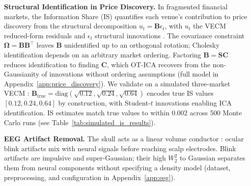 \documentclass[accepted]{tpm2026} %
\begin{document}
\textbf{Structural Identification in Price Discovery.}
In fragmented financial markets, the Information Share (IS) \citep{hasbrouck1995, baillie2002} quantifies each venue's contribution to price discovery from the structural decomposition $u_t = \mathbf{B}\epsilon_t$, with $u_t$ the VECM reduced-form residuals and $\epsilon_t$ structural innovations \citep{engle1987, johansen1991}. The covariance constraint $\boldsymbol{\Omega} = \mathbf{B}\mathbf{B}^\top$ leaves $\mathbf{B}$ unidentified up to an orthogonal rotation; Cholesky identification depends on an arbitrary market ordering. Factoring $\mathbf{B} = \mathbf{S}\mathbf{C}$ \citep{zema2025} reduces identification to finding $\mathbf{C}$, which OT-ICA recovers from the non-Gaussianity of innovations without ordering assumptions (full model in Appendix~\ref{app:price_discovery}).
We validate on a simulated three-market VECM \citep{zema2025}: $\mathbf{B}_\text{true} = \mathrm{diag}(\sqrt{0.12}, \sqrt{0.24}, \sqrt{0.64})$ encodes true IS values $[0.12, 0.24, 0.64]$ by construction, with Student-$t$ innovations enabling ICA identification.
IS estimates match true values to within $0.002$ across 500 Monte Carlo runs (see Table~\ref{tab:simulated_is_results}).

\begin{table}[tbp]
    \centering
    \caption{IS recovery across 500 Monte Carlo runs without imposing Cholesky ordering.}
    \label{tab:simulated_is_results}
\end{table}

\textbf{EEG Artifact Removal.}
The skull acts as a linear volume conductor \citep{hyvarinen2001}: ocular blink artifacts mix with neural signals before reaching scalp electrodes. 
Blink artifacts are impulsive and super-Gaussian; their high $W_2^2$ to Gaussian separates them from neural components without specifying a density model (dataset, preprocessing, and configuration in Appendix~\ref{app:eeg}).
\end{document}
